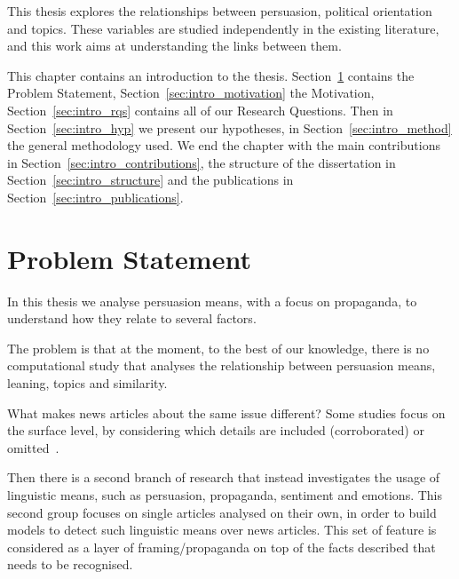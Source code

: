 
This thesis explores the relationships between persuasion, political orientation and topics.
These variables are studied independently in the existing literature, and this work aims at understanding the links between them.









This chapter contains an introduction to the thesis.
Section~\ref{sec:intro_problem} contains the Problem Statement, Section~\ref{sec:intro_motivation} the Motivation, Section~\ref{sec:intro_rqs} contains all of our Research Questions. Then in Section~\ref{sec:intro_hyp} we present our hypotheses, in Section~\ref{sec:intro_method} the general methodology used. We end the chapter with the main contributions in Section~\ref{sec:intro_contributions}, the structure of the dissertation in Section~\ref{sec:intro_structure} and the publications in Section~\ref{sec:intro_publications}.


\section{\statusgreen Problem Statement}
\label{sec:intro_problem}



In this thesis we analyse persuasion means, with a focus on propaganda, to understand how they relate to several factors.

The problem is that at the moment, to the best of our knowledge, there is no computational study that analyses the relationship between persuasion means, leaning, topics and similarity.

What makes news articles about the same issue different? 
Some studies focus on the surface level, by considering which details are included (corroborated) or omitted~\citep{bountouridis2018explaining}.

Then there is a second branch of research that instead investigates the usage of linguistic means, such as persuasion, propaganda, sentiment and emotions. This second group focuses on single articles analysed on their own, in order to build models to detect such linguistic means over news articles. This set of feature is considered as a layer of framing/propaganda on top of the facts described that needs to be recognised.

